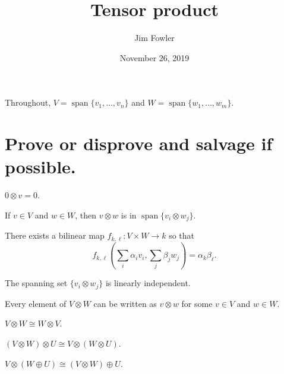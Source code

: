 \documentclass{homework}
\author{Jim Fowler}
\title{Tensor product}
\date{November 26, 2019}
\DeclareMathOperator{\Span}{span}
\begin{document}
\maketitle

Throughout, $V = \Span \{ v_1, \ldots, v_n \}$ and $W = \Span \{ w_1, \ldots, w_m \}$.  

\section{Prove or disprove and salvage if possible.}

\begin{problem}
  $0 \otimes v = 0$.
\end{problem}

\vfill

\begin{problem}
  If $v \in V$ and $w \in W$, then $v \otimes w$ is in $\Span \{ v_i \otimes w_j \}$.
\end{problem}

\vfill

\begin{problem}
  There exists a bilinear map $f_{k,\ell} :V \times W \to k$ so that \[
    f_{k,\ell}( \sum_i \alpha_i v_i, \sum_j \beta_j w_j) = \alpha_k \beta_\ell.
  \]
\end{problem}

\vfill

\begin{problem}
  The spanning set $\{ v_i \otimes w_j \}$ is linearly independent.
\end{problem}

\vfill

\begin{problem}
  Every element of $V \otimes W$ can be written as $v \otimes w$ for some $v \in V$ and $w \in W$.
\end{problem}

\vfill

\begin{problem}
  $V \otimes W \cong W \otimes V$.
\end{problem}

\vfill

\begin{problem}
  $(V \otimes W) \otimes U \cong V \otimes (W \otimes U)$.
\end{problem}

\vfill

\begin{problem}
  $V \otimes (W \oplus U) \cong (V \otimes W) \oplus U$.
\end{problem}
\end{document}
